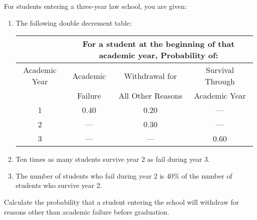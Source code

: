 For students entering a three-year law school, you are given:
\begin{enumerate}
\item The following double decrement table:
\begin{center}\begin{tabular}{|c|c|c|c|}\hline
                 & \multicolumn{3}{|c|}{For a student at the beginning of that academic year, Probability of: } \\ \hline
  Academic Year  & Academic  & Withdrawal for    & Survival Through    \\ 
                 & Failure   & All Other Reasons & Academic Year       \\ \hline \hline
       1         & 0.40             & 0.20                             & ---  \\ \hline                
       2         &  ---             & 0.30                             & ---  \\ \hline   
       3         &  ---             & ---                              & 0.60 \\ \hline   
\end{tabular}\end{center}
\item Ten times as many students survive year 2 as fail during year 3.
\item The number of students who fail during year 2 is 40\% of the number of students who survive year 2.
\end{enumerate}
Calculate the probability that a student entering the school will withdraw for reasons
other than academic failure before graduation.
